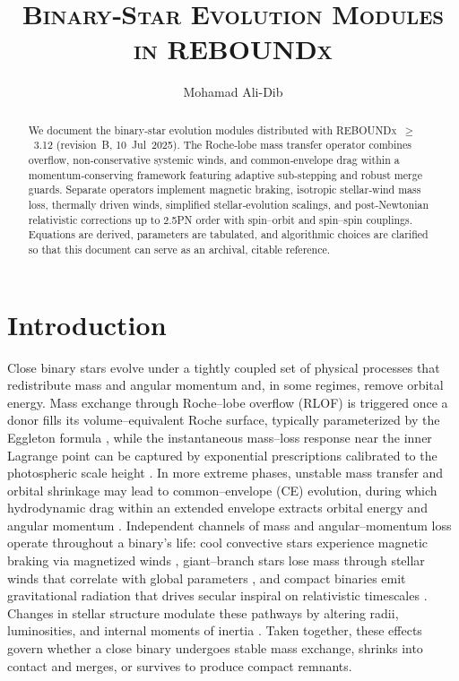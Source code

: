\documentclass[11pt]{article}
\begin{document}
\title{\textsc{Binary‑Star Evolution Modules in
         \textnormal{REBOUNDx}}}
\author{Mohamad Ali-Dib}
\date{}
\maketitle
\vspace*{-1.5em}

\begin{abstract}
We document the binary‑star evolution modules distributed with
\textsc{REBOUNDx} $\ge$ 3.12 (revision B, 10 Jul 2025).
The Roche‑lobe mass transfer operator combines overflow, non‑conservative
systemic winds, and common‑envelope drag within a momentum‑conserving
framework featuring adaptive sub‑stepping and robust merge guards.
Separate operators implement magnetic braking, isotropic stellar‑wind
mass loss, thermally driven winds, simplified stellar‑evolution scalings,
and post‑Newtonian relativistic corrections up to 2.5PN order with spin--orbit and spin--spin couplings.  Equations are derived,
parameters are tabulated, and algorithmic
choices are clarified so that this document can serve as an archival,
citable reference.
\end{abstract}



\section{Introduction}\label{sec:intro}
Close binary stars evolve under a tightly coupled set of physical processes that redistribute mass and angular momentum and, in some regimes, remove orbital energy. Mass exchange through Roche–lobe overflow (RLOF) is triggered once a donor fills its volume–equivalent Roche surface, typically parameterized by the Eggleton formula \citep{Eggleton1983}, while the instantaneous mass–loss response near the inner Lagrange point can be captured by exponential prescriptions calibrated to the photospheric scale height \citep{Ritter1988}. In more extreme phases, unstable mass transfer and orbital shrinkage may lead to common–envelope (CE) evolution, during which hydrodynamic drag within an extended envelope extracts orbital energy and angular momentum \citep{Ostriker1999}. Independent channels of mass and angular–momentum loss operate throughout a binary’s life: cool convective stars experience magnetic braking via magnetized winds \citep{Verbunt1981,Kawaler1988}, giant–branch stars lose mass through stellar winds that correlate with global parameters \citep{Reimers1975}, and compact binaries emit gravitational radiation that drives secular inspiral on relativistic timescales \citep{Peters1964}. Changes in stellar structure modulate these pathways by altering radii, luminosities, and internal moments of inertia \citep{Hurley2000}. Taken together, these effects govern whether a close binary undergoes stable mass exchange, shrinks into contact and merges, or survives to produce compact remnants.
\end{document}
